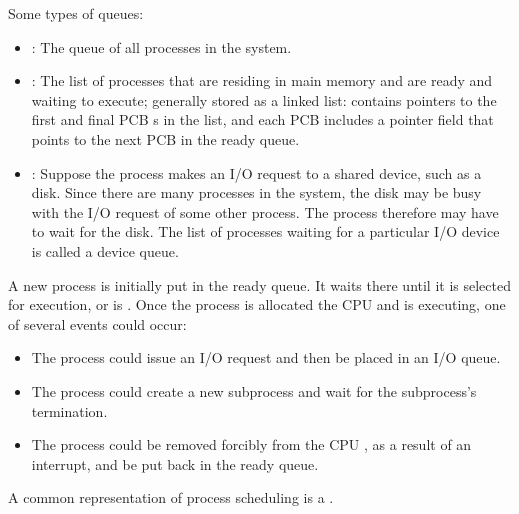     \par Some types of queues:
      \begin{itemize}
        \item {}: The queue of all processes in the system.
        \item {}: The list of  processes that are residing in main
          memory and are ready and waiting to execute; generally stored as a linked list: contains pointers to the first and final PCB s in the list, and each PCB includes a pointer field that points to the next PCB in the ready queue.
        \item {}: Suppose the process makes an I/O request to a shared device, such as a disk. Since there are many processes in the system, the disk may be busy with the I/O request of some other process. The process therefore may have to wait for the disk. The list of processes waiting for a particular I/O device is called a device queue.
      \end{itemize}
    \par A new process is initially put in the ready queue. It waits there
      until it is selected for execution, or is .  Once the process is allocated the CPU and is executing, one of several events could occur:
      \begin{itemize}
        \item The process could issue an I/O request and then be placed in an I/O queue.
        \item The process could create a new subprocess and wait for the subprocess’s termination.
        \item The process could be removed forcibly from the CPU , as a result of an interrupt, and be put back in the ready queue.
      \end{itemize}
    \par A common representation of process scheduling is a .

